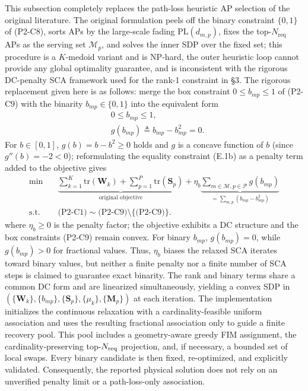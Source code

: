 \documentclass[12pt,a4paper]{article}
\newcommand{\mat}[1]{\mathbf{#1}}
\newcommand{\tr}{\text{tr}}
\begin{document}
This subsection completely replaces the path-loss heuristic AP selection of the original literature. The original formulation peels off the binary constraint $\{0,1\}$ of (P2-C8), sorts APs by the large-scale fading $\text{PL}(d_{m,p})$, fixes the top-$N_{\text{req}}$ APs as the serving set $\mathcal{M}_p$, and solves the inner SDP over the fixed set; this procedure is a $K$-medoid variant and is NP-hard, the outer heuristic loop cannot provide any global optimality guarantee, and is inconsistent with the rigorous DC-penalty SCA framework used for the rank-1 constraint in \S3. The rigorous replacement given here is as follows: merge the box constraint $0 \leq b_{mp} \leq 1$ of (P2-C9) with the binarity $b_{mp} \in \{0,1\}$ into the equivalent form
\begin{subequations}\label{eq:b-rewrite}
\begin{align}
& 0 \leq b_{mp} \leq 1, \tag{E.1a} \\
& g(b_{mp}) \triangleq b_{mp} - b_{mp}^2 = 0. \tag{E.1b}
\end{align}
\end{subequations}
For $b \in [0,1]$, $g(b) = b - b^2 \geq 0$ holds and $g$ is a concave function of $b$ (since $g''(b) = -2 < 0$); reformulating the equality constraint (E.1b) as a penalty term added to the objective gives
\begin{equation}
\begin{aligned}
\min \quad &\underbrace{\sum_{k=1}^K \tr(\mat{W}_k) + \sum_{p=1}^P \tr(\mat{S}_p)}_{\text{original objective}}
+ \eta_b \underbrace{\sum_{m \in \mathcal{M}, p \in \mathcal{P}} g(b_{mp})}_{= \sum_{m,p} (b_{mp} - b_{mp}^2)} \\
\text{s.t.}\quad &\text{(P2-C1)} \sim \text{(P2-C9)} \setminus \{\text{(P2-C9)}\}.
\end{aligned}\tag{P2-DCP}
\end{equation}
where $\eta_b \geq 0$ is the penalty factor; the objective exhibits a DC structure and the box constraints (P2-C9) remain convex. For binary $b_{mp}$, $g(b_{mp})=0$, while $g(b_{mp})>0$ for fractional values. Thus, $\eta_b$ biases the relaxed SCA iterates toward binary values, but neither a finite penalty nor a finite number of SCA steps is claimed to guarantee exact binarity. The rank and binary terms share a common DC form and are linearized simultaneously, yielding a convex SDP in $(\{\mat{W}_k\},\{b_{mp}\},\{\mat{S}_p\},\{\mu_k\},\{\mat{M}_p\})$ at each iteration. The implementation initializes the continuous relaxation with a cardinality-feasible uniform association and uses the resulting fractional association only to guide a finite recovery pool. This pool includes a geometry-aware greedy FIM assignment, the cardinality-preserving top-$N_{\rm req}$ projection, and, if necessary, a bounded set of local swaps. Every binary candidate is then fixed, re-optimized, and explicitly validated. Consequently, the reported physical solution does not rely on an unverified penalty limit or a path-loss-only association.
\end{document}
